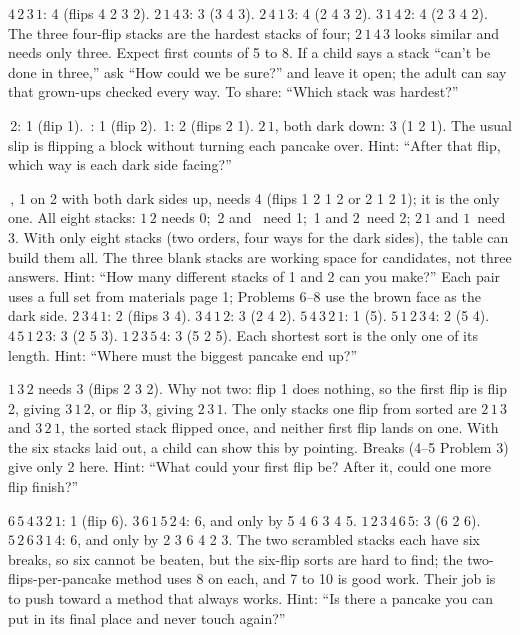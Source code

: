 $4\,2\,3\,1$: 4 (flips 4 2 3 2). $2\,1\,4\,3$: 3 (3 4 3). $2\,4\,1\,3$: 4 (2 4 3 2). $3\,1\,4\,2$: 4 (2 3 4 2). The three four-flip stacks are the hardest stacks of four; $2\,1\,4\,3$ looks similar and needs only three. Expect first counts of 5 to 8. If a child says a stack ``can't be done in three,'' ask ``How could we be sure?'' and leave it open; the adult can say that grown-ups checked every way. To share: ``Which stack was hardest?''

\,2: 1 (flip 1). \,: 1 (flip 2). \,1: 2 (flips 2 1). $2\,1$, both dark down: 3 (1 2 1). The usual slip is flipping a block without turning each pancake over. Hint: ``After that flip, which way is each dark side facing?''

\,, 1 on 2 with both dark sides up, needs 4 (flips 1 2 1 2 or 2 1 2 1); it is the only one. All eight stacks: $1\,2$ needs 0; \,2 and \, need 1; \,1 and $2$\, need 2; $2\,1$ and $1$\, need 3. With only eight stacks (two orders, four ways for the dark sides), the table can build them all. The three blank stacks are working space for candidates, not three answers. Hint: ``How many different stacks of 1 and 2 can you make?''
\newpage
{}
Each pair uses a full set from materials page 1; Problems 6--8 use the brown face as the dark side.
$2\,3\,4\,1$: 2 (flips 3 4). $3\,4\,1\,2$: 3 (2 4 2). $5\,4\,3\,2\,1$: 1 (5). $5\,1\,2\,3\,4$: 2 (5 4). $4\,5\,1\,2\,3$: 3 (2 5 3). $1\,2\,3\,5\,4$: 3 (5 2 5). Each shortest sort is the only one of its length. Hint: ``Where must the biggest pancake end up?''

$1\,3\,2$ needs 3 (flips 2 3 2). Why not two: flip 1 does nothing, so the first flip is flip 2, giving $3\,1\,2$, or flip 3, giving $2\,3\,1$. The only stacks one flip from sorted are $2\,1\,3$ and $3\,2\,1$, the sorted stack flipped once, and neither first flip lands on one. With the six stacks laid out, a child can show this by pointing. Breaks (4--5 Problem 3) give only 2 here. Hint: ``What could your first flip be? After it, could one more flip finish?''

$6\,5\,4\,3\,2\,1$: 1 (flip 6). $3\,6\,1\,5\,2\,4$: 6, and only by 5 4 6 3 4 5. $1\,2\,3\,4\,6\,5$: 3 (6 2 6). $5\,2\,6\,3\,1\,4$: 6, and only by 2 3 6 4 2 3. The two scrambled stacks each have six breaks, so six cannot be beaten, but the six-flip sorts are hard to find; the two-flips-per-pancake method uses 8 on each, and 7 to 10 is good work. Their job is to push toward a method that always works. Hint: ``Is there a pancake you can put in its final place and never touch again?''

